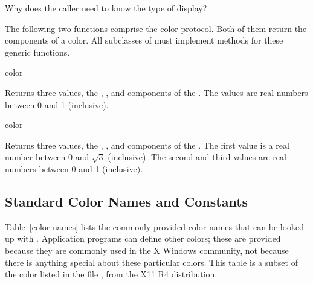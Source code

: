  {Why does the caller need to know the type of display?}


The following two functions comprise the color protocol.  Both of them return
the components of a color.  All subclasses of  must implement methods
for these generic functions.

 {color}

Returns three values, the , , and  components of
the  . The values are real numbers between 0 and 1
(inclusive).

 {color}

Returns three values, the , , and 
components of the  .  The first value is a real number
between 0 and $\sqrt{3}$ (inclusive).  The second and third values are real
numbers between 0 and 1 (inclusive).


\subsection {Standard Color Names and Constants}

Table~\ref{color-names} lists the commonly provided color names that can be
looked up with .  Application programs can define other
colors; these are provided because they are commonly used in the X Windows
community, not because there is anything special about these particular colors.
This table is a subset of the color listed in the file
, from the X11 R4 distribution.

